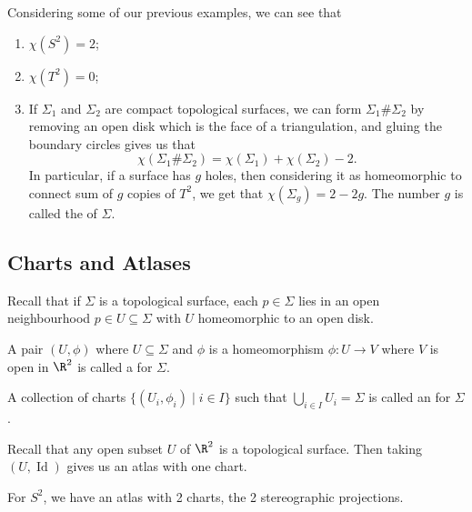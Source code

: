 \begin{example}
    Considering some of our previous examples, we can see that
    \begin{enumerate}[label=(\roman*)]
        \item $\chi(S^2) = 2$;
        \item $\chi(T^2) = 0$;
        \item If $\Sigma_1$ and $\Sigma_2$ are compact topological surfaces, we can form $\Sigma_1 \# \Sigma_2$ by removing an open disk which is the face of a triangulation, and gluing the boundary circles gives us that
        $$
        \chi(\Sigma_1 \# \Sigma_2) = \chi(\Sigma_1) + \chi(\Sigma_2) - 2.
        $$
        In particular, if a surface has $g$ holes, then considering it as homeomorphic to connect sum of $g$ copies of $T^2$, we get that $\chi(\Sigma_g) = 2 - 2g$. The number $g$ is called the  of $\Sigma$.
    \end{enumerate}
\end{example}

\subsection{Charts and Atlases}

Recall that if $\Sigma$ is a topological surface, each $p \in \Sigma$ lies in an open neighbourhood $p \in U \subseteq \Sigma$ with $U$ homeomorphic to an open disk.

\begin{definition}[Chart]
    A pair $(U, \phi)$ where $U \subseteq \Sigma$ and $\phi$ is a homeomorphism $\phi: U \rightarrow V$ where $V$ is open in $\R^2$ is called a  for $\Sigma$.
\end{definition}

\begin{definition}[Atlas]
    A collection of charts $\{(U_i, \phi_i) \mid i \in I\}$ such that $\bigcup_{i \in I} U_i = \Sigma$ is called an  for $\Sigma$.
\end{definition}

\begin{example}
    Recall that any open subset $U$ of $\R^2$ is a topological surface. Then taking $(U, \operatorname{Id})$ gives us an atlas with one chart. 
\end{example}

\begin{example}
    For $S^2$, we have an atlas with 2 charts, the 2 stereographic projections.
\end{example}

